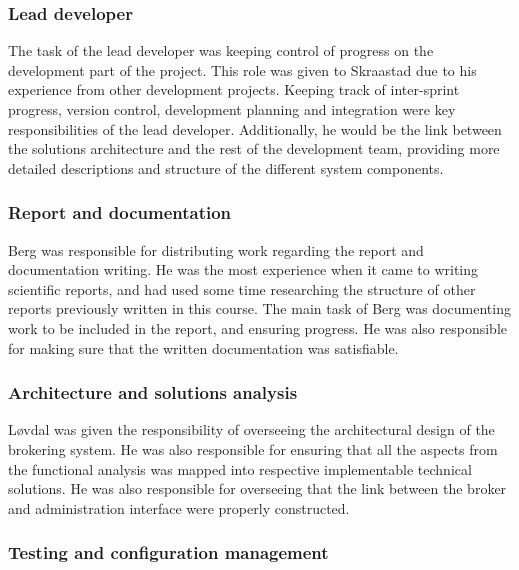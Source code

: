 \subsubsection{Lead developer}
\label{subsec:process_and_methodology-project_organization-lead_developer}

The task of the lead developer was keeping control of progress on the development part of the project. This role was given to Skraastad due to his experience from other development projects. Keeping track of inter-sprint progress, version control, development planning and integration were key responsibilities of the lead developer. Additionally, he would be the link between the solutions architecture and the rest of the development team, providing more detailed descriptions and structure of the different system components.

\subsubsection{Report and documentation}
\label{subsec:process_and_methodology-project_organization-report_and_documentation}

Berg was responsible for distributing work regarding the report and documentation writing. He was the most experience when it came to writing scientific reports, and had used some time researching the structure of other reports previously written in this course. The main task of Berg was documenting work to be included in the report, and ensuring progress. He was also responsible for making sure that the written documentation was satisfiable.

\subsubsection{Architecture and solutions analysis}
\label{subsec:process_and_methodology-project_organization-architecture_and_solutions_analysis}

Løvdal was given the responsibility of overseeing the architectural design of the brokering system. He was also responsible for ensuring that all the aspects from the functional analysis was mapped into respective implementable technical solutions. He was also responsible for overseeing that the link between the broker and administration interface were properly constructed.

\subsubsection{Testing and configuration management}
\label{subsec:process_and_methodology-project_organization-testing_and_configuration_management}


